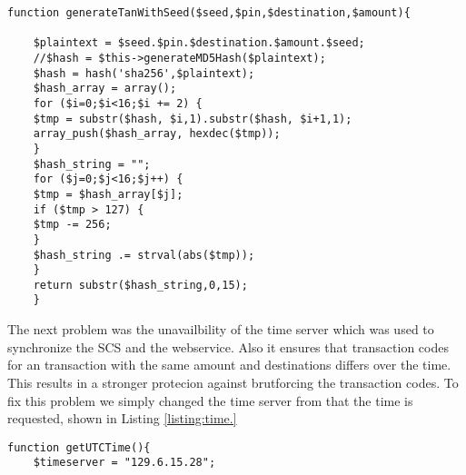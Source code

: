\begin{lstlisting}[caption = Generation of a TAN using sha256, label=listing:sha256]
	function generateTanWithSeed($seed,$pin,$destination,$amount){
	
	$plaintext = $seed.$pin.$destination.$amount.$seed;
	//$hash = $this->generateMD5Hash($plaintext);
	$hash = hash('sha256',$plaintext);
	$hash_array = array();
	for ($i=0;$i<16;$i += 2) {
	$tmp = substr($hash, $i,1).substr($hash, $i+1,1);
	array_push($hash_array, hexdec($tmp));
	}
	$hash_string = "";
	for ($j=0;$j<16;$j++) {
	$tmp = $hash_array[$j];
	if ($tmp > 127) {
	$tmp -= 256;
	}
	$hash_string .= strval(abs($tmp));
	}
	return substr($hash_string,0,15);
	}
\end{lstlisting}
The next problem was the  unavailbility of the time server which was used to synchronize the SCS and the webservice. Also it ensures that transaction codes for an transaction with the same amount and destinations differs over the time. This results in a stronger protecion against brutforcing the transaction codes. 
To fix this problem we simply changed the time server from that the time is requested, shown in Listing \ref{listing:time.}

\begin{lstlisting}[caption= New TimeServer IP, label=listing:time]
	function getUTCTime(){
	$timeserver = "129.6.15.28";
\end{lstlisting}